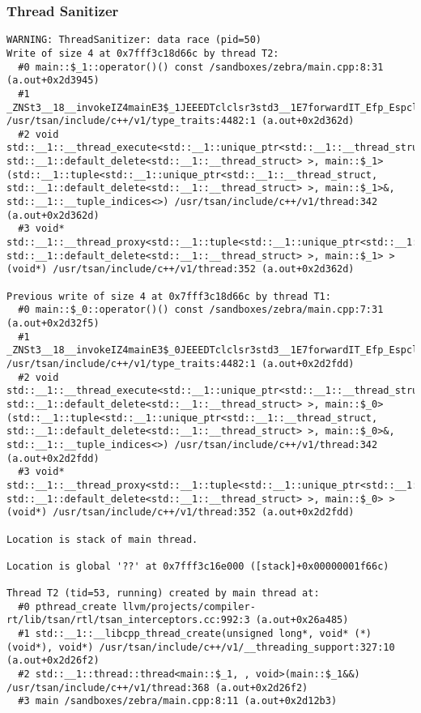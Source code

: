 \begin{frame}[fragile]
\frametitle{Thread Sanitizer}
  \begin{Verbatim}[fontsize=\tiny]
WARNING: ThreadSanitizer: data race (pid=50)
Write of size 4 at 0x7fff3c18d66c by thread T2:
  #0 main::$_1::operator()() const /sandboxes/zebra/main.cpp:8:31 (a.out+0x2d3945)
  #1 _ZNSt3__18__invokeIZ4mainE3$_1JEEEDTclclsr3std3__1E7forwardIT_Efp_Espclsr3std3__1E7forwardIT0_Efp0_EEEOS2_DpOS3_ /usr/tsan/include/c++/v1/type_traits:4482:1 (a.out+0x2d362d)
  #2 void std::__1::__thread_execute<std::__1::unique_ptr<std::__1::__thread_struct, std::__1::default_delete<std::__1::__thread_struct> >, main::$_1>(std::__1::tuple<std::__1::unique_ptr<std::__1::__thread_struct, std::__1::default_delete<std::__1::__thread_struct> >, main::$_1>&, std::__1::__tuple_indices<>) /usr/tsan/include/c++/v1/thread:342 (a.out+0x2d362d)
  #3 void* std::__1::__thread_proxy<std::__1::tuple<std::__1::unique_ptr<std::__1::__thread_struct, std::__1::default_delete<std::__1::__thread_struct> >, main::$_1> >(void*) /usr/tsan/include/c++/v1/thread:352 (a.out+0x2d362d)

Previous write of size 4 at 0x7fff3c18d66c by thread T1:
  #0 main::$_0::operator()() const /sandboxes/zebra/main.cpp:7:31 (a.out+0x2d32f5)
  #1 _ZNSt3__18__invokeIZ4mainE3$_0JEEEDTclclsr3std3__1E7forwardIT_Efp_Espclsr3std3__1E7forwardIT0_Efp0_EEEOS2_DpOS3_ /usr/tsan/include/c++/v1/type_traits:4482:1 (a.out+0x2d2fdd)
  #2 void std::__1::__thread_execute<std::__1::unique_ptr<std::__1::__thread_struct, std::__1::default_delete<std::__1::__thread_struct> >, main::$_0>(std::__1::tuple<std::__1::unique_ptr<std::__1::__thread_struct, std::__1::default_delete<std::__1::__thread_struct> >, main::$_0>&, std::__1::__tuple_indices<>) /usr/tsan/include/c++/v1/thread:342 (a.out+0x2d2fdd)
  #3 void* std::__1::__thread_proxy<std::__1::tuple<std::__1::unique_ptr<std::__1::__thread_struct, std::__1::default_delete<std::__1::__thread_struct> >, main::$_0> >(void*) /usr/tsan/include/c++/v1/thread:352 (a.out+0x2d2fdd)

Location is stack of main thread.

Location is global '??' at 0x7fff3c16e000 ([stack]+0x00000001f66c)

Thread T2 (tid=53, running) created by main thread at:
  #0 pthread_create llvm/projects/compiler-rt/lib/tsan/rtl/tsan_interceptors.cc:992:3 (a.out+0x26a485)
  #1 std::__1::__libcpp_thread_create(unsigned long*, void* (*)(void*), void*) /usr/tsan/include/c++/v1/__threading_support:327:10 (a.out+0x2d26f2)
  #2 std::__1::thread::thread<main::$_1, , void>(main::$_1&&) /usr/tsan/include/c++/v1/thread:368 (a.out+0x2d26f2)
  #3 main /sandboxes/zebra/main.cpp:8:11 (a.out+0x2d12b3)


\end{Verbatim}
\end{frame}
